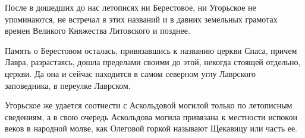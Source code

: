 После в дошедших до нас летописях ни Берестовое, ни Угорьское не упоминаются, не встречал я этих названий и в давних земельных грамотах времен Великого Княжества Литовского и позднее.

Память о Берестовом осталась, привязавшись к названию церкви Спаса, причем Лавра, разрастаясь, дошла пределами своими до этой, некогда стоящей отдельно, церкви. Да она и сейчас находится в самом северном углу Лаврского заповедника, в переулке Лаврском.

Угорьское же удается соотнести с Аскольдовой могилой только по летописным сведениям, а в свою очередь Аскольдова могила привязана к местности испокон веков в народной молве, как Олеговой горкой называют Щекавицу или часть ее. 

